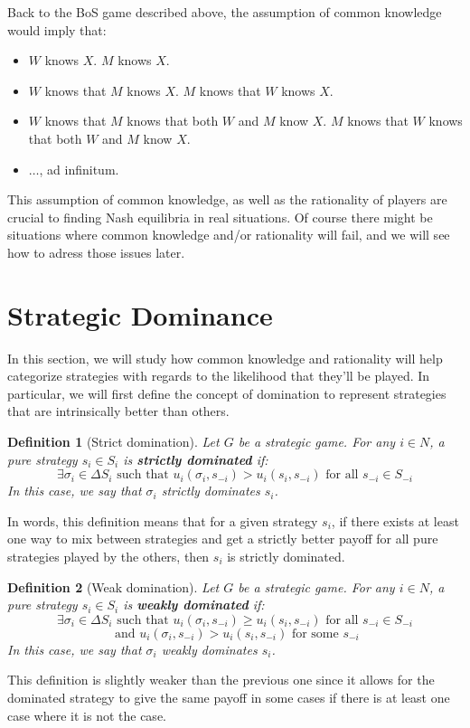 \documentclass[12pt]{report}
\newtheorem{definition}{Definition}[chapter]
\begin{document}
Back to the BoS game described above, the assumption of common knowledge would imply that: \begin{itemize}
\item $W$ knows $X$. $M$ knows $X$.
\item $W$ knows that $M$ knows $X$. $M$ knows that $W$ knows $X$.
\item $W$ knows that $M$ knows that both $W$ and $M$ know $X$. $M$ knows that $W$ knows that both $W$ and $M$ know $X$.
\item $\hdots$, ad infinitum.
\end{itemize}

This assumption of common knowledge, as well as the rationality of players are crucial to finding Nash equilibria in real situations. Of course there might be situations where common knowledge and/or rationality will fail, and we will see how to adress those issues later.

\section{Strategic Dominance}

In this section, we will study how common knowledge and rationality will help categorize strategies with regards to the likelihood that they'll be played. In particular, we will first define the concept of domination to represent strategies that are intrinsically better than others.

\begin{definition}[Strict domination]
Let $G$ be a strategic game. For any $i\in N$, a pure strategy $s_i\in S_i$ is \textbf{strictly dominated} if: $$\exists \sigma_i\in\Delta S_i \text{ such that } u_i(\sigma_i,s_{-i}) > u_i(s_i, s_{-i}) \text{ for all } s_{-i}\in S_{-i} $$ In this case, we say that $\sigma_i$ strictly dominates $s_i$.
\end{definition} 
In words, this definition means that for a given strategy $s_i$, if there exists at least one way to mix between strategies and get a strictly better payoff for all pure strategies played by the others, then $s_i$ is strictly dominated.

\begin{definition}[Weak domination]
Let $G$ be a strategic game. For any $i\in N$, a pure strategy $s_i\in S_i$ is \textbf{weakly dominated} if: $$\exists \sigma_i\in\Delta S_i \text{ such that } u_i(\sigma_i,s_{-i}) \geq u_i(s_i, s_{-i}) \text{ for all } s_{-i}\in S_{-i}$$ $$\text{ and } u_i(\sigma_i,s_{-i}) > u_i(s_i, s_{-i}) \text{ for some } s_{-i}$$ In this case, we say that $\sigma_i$ weakly dominates $s_i$.
\end{definition}
This definition is slightly weaker than the previous one since it allows for the dominated strategy to give the same payoff in some cases if there is at least one case where it is not the case.
\end{document}
